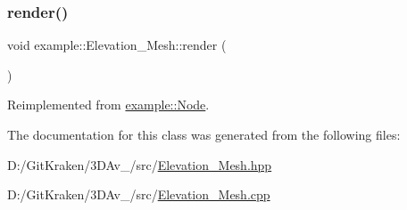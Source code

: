 \subsubsection{\texorpdfstring{render()}{render()}}
{\footnotesize\ttfamily void example\+::\+Elevation\+\_\+\+Mesh\+::render (\begin{DoxyParamCaption}{ }\end{DoxyParamCaption})\hspace{0.3cm}{\ttfamily [virtual]}}



Reimplemented from \mbox{\hyperlink{classexample_1_1_node_a6e9c30ac62693f7fa0a4080202df45df}{example\+::\+Node}}.



The documentation for this class was generated from the following files\+:\begin{DoxyCompactItemize}
\item 
D\+:/\+Git\+Kraken/3\+D\+Av\+\_/src/\mbox{\hyperlink{_elevation___mesh_8hpp}{Elevation\+\_\+\+Mesh.\+hpp}}\item 
D\+:/\+Git\+Kraken/3\+D\+Av\+\_/src/\mbox{\hyperlink{_elevation___mesh_8cpp}{Elevation\+\_\+\+Mesh.\+cpp}}\end{DoxyCompactItemize}
